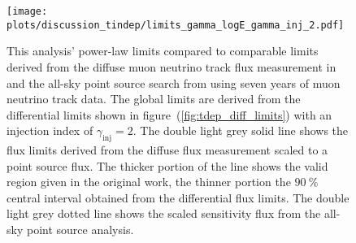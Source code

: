 \begin{figure}[htpb]
  \centering
  \texttt{[image: plots/discussion\_tindep/limits\_gamma\_logE\_gamma\_inj\_2.pdf]}
  \caption[Time-integrated analysis global power-law limits $\gamma_\text{inj}=3$]{
    This analysis' power-law limits compared to comparable limits derived from the diffuse muon neutrino track flux measurement in \cite{Haack:2017dxi} and the all-sky point source search from \cite{Aartsen:2016oji} using seven years of muon neutrino track data.
    The global limits are derived from the differential limits shown in figure~(\ref{fig:tdep_diff_limits}) with an injection index of $\gamma_\text{inj}=2$.
    The double light grey solid line shows the flux limits derived from the diffuse flux measurement scaled to a point source flux.
    The thicker portion of the line shows the valid region given in the original work, the thinner portion the $\SI{90}{\percent}$ central interval obtained from the differential flux limits.
    The double light grey dotted line shows the scaled sensitivity flux from the all-sky point source analysis.
  }
  \label{fig:tdep_limits_gamma_logE_gamma_inj_2}
\end{figure}
